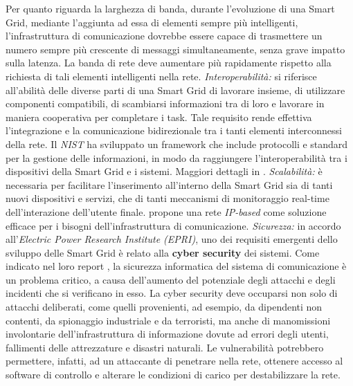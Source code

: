 Per quanto riguarda la larghezza di banda, durante l'evoluzione di una Smart Grid, mediante l'aggiunta ad essa di elementi sempre più intelligenti, l'infrastruttura di comunicazione dovrebbe essere capace di trasmettere un numero sempre più crescente di messaggi simultaneamente, senza grave impatto sulla latenza. La banda di rete deve aumentare più rapidamente rispetto alla richiesta di tali elementi intelligenti nella rete.
\newline \newline
\textit{Interoperabilità:} si riferisce all'abilità delle diverse parti di una Smart Grid di lavorare insieme, di utilizzare componenti compatibili, di scambiarsi informazioni tra di loro e lavorare in maniera cooperativa per completare i task. Tale requisito rende effettiva l'integrazione e la comunicazione bidirezionale tra i tanti elementi interconnessi della rete.\newline
Il \emph{NIST} ha sviluppato un framework che include protocolli e standard per la gestione delle informazioni, in modo da raggiungere l'interoperabilità tra i dispositivi della Smart Grid e i sistemi. Maggiori dettagli in \cite{surveymotiv}.
\newline \newline
\textit{Scalabilità:} è necessaria per facilitare l'inserimento all'interno della Smart Grid sia di tanti nuovi dispositivi e servizi, che di tanti meccanismi di monitoraggio real-time dell'interazione dell'utente finale. \newline
\cite{surveymotiv} propone una rete \emph{IP-based} come soluzione efficace per i bisogni dell'infrastruttura di comunicazione.
\newline \newline
\textit{Sicurezza:} in accordo all'\emph{Electric Power Research Institute (EPRI)}, uno dei requisiti emergenti dello sviluppo delle Smart Grid è relato alla \textbf{cyber security} dei sistemi. Come indicato nel loro report \cite{surveymotiv}, la sicurezza informatica del sistema di comunicazione è un problema critico, a causa dell'aumento del potenziale degli attacchi e degli incidenti che si verificano in esso. \newline 
La cyber security deve occuparsi non solo di attacchi deliberati, come quelli provenienti, ad esempio, da dipendenti non contenti, da spionaggio industriale e da terroristi, ma anche di manomissioni involontarie dell'infrastruttura di informazione dovute ad errori degli utenti, fallimenti delle attrezzature e disastri naturali. Le vulnerabilità potrebbero permettere, infatti, ad un attaccante di penetrare nella rete, ottenere accesso al software di controllo e alterare le condizioni di carico per destabilizzare la rete. \newline
